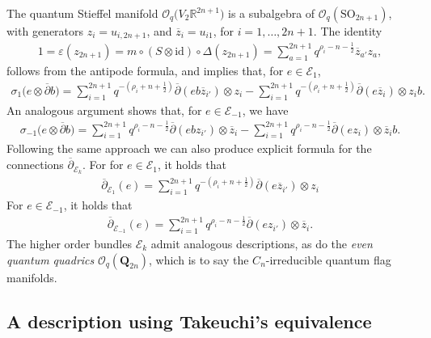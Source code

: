 \documentclass[pdftex]{sigma}
\numberwithin{equation}{section}
\newcommand{\e}{\varepsilon}
\newcommand\adel{\overline{\partial}}
\begin{document}
The quantum Stieffel manifold $\mathcal{O}_q\big(V_2\mathbb{R}^{2n+1}\big)$ is a subalgebra of $\mathcal{O}_q(\mathrm{SO}_{2n+1})$, with generators $z_i = u_{i,2n+1}$, and $\overline{z}_i = u_{i1}$, for $i = 1, \dots, 2n+1$. The identity
\begin{gather*}
1 = \e(z_{2n+1}) = m \circ (S \otimes \mathrm{id}) \circ \Delta(z_{2n+1}) = \sum_{a=1}^{2n+1} q^{\rho_i - n - \frac{1}{2}}\overline{z}_{a'}z_a,
\end{gather*}
follows from the antipode formula, and implies that, for $e \in \mathcal{E}_1$,
\begin{gather*}
\sigma_1\big(e \otimes \adel b\big) = \sum_{i=1}^{2n+1} q^{-(\rho_i + n + \frac{1}{2})} \adel(eb\overline{z}_{i'}) \otimes z_i - \sum_{i=1}^{2n+1} q^{-(\rho_i + n + \frac{1}{2})} \adel(e\overline{z}_{i}) \otimes z_ib.
\end{gather*}
An analogous argument shows that, for $e \in \mathcal{E}_{-1}$, we have
\begin{gather*}
\sigma_{-1}\big(e \otimes \adel b\big) = \sum_{i=1}^{2n+1} q^{\rho_i - n - \frac{1}{2}}\adel(ebz_{i'}) \otimes \overline{z}_i - \sum_{i=1}^{2n+1} q^{\rho_i - n - \frac{1}{2}} \adel(ez_{i}) \otimes \overline{z}_ib.
\end{gather*}
Following the same approach we can also produce explicit formula for the connections $\adel_{\mathcal{E}_k}$. For for $e \in \mathcal{E}_1$, it holds that
\begin{gather*}
\adel_{\mathcal{E}_1}(e) = \sum_{i=1}^{2n+1} q^{-(\rho_i + n + \frac{1}{2})} \adel(e\overline{z}_{i'}) \otimes z_i
\end{gather*}
For $e \in \mathcal{E}_{-1}$, it holds that
\begin{gather*}
\adel_{\mathcal{E}_{-1}}(e) = \sum_{i=1}^{2n+1} q^{\rho_i - n - \frac{1}{2}}\adel(ez_{i'}) \otimes \overline{z}_i.
\end{gather*}
The higher order bundles $\mathcal{E}_k$ admit analogous descriptions, as do the \emph{even quantum quadrics} $\mathcal{O}_q(\mathbf{Q}_{2n})$, which is to say the $C_{n}$-irreducible quantum flag manifolds.

\subsection{A description using Takeuchi's equivalence} \label{subsection:Takeuchi}
\end{document}
